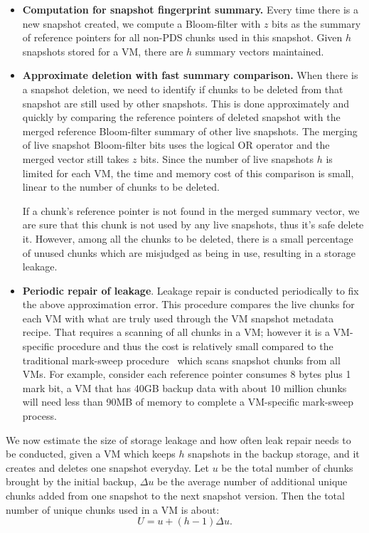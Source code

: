 \begin{itemize}
\item {\bf Computation for snapshot fingerprint summary.}
Every time there is a new snapshot created,
we compute a Bloom-filter with $z$ bits as the summary of reference pointers for all non-PDS chunks used 
in this snapshot. Given $h$ snapshots stored for a VM, there are $h$ summary vectors maintained.

\item {\bf Approximate deletion with fast summary comparison.}
When there is a snapshot deletion,  
we need to identify if  chunks to be deleted from that snapshot
are still used by other snapshots. 
This is done approximately and quickly by comparing the 
reference pointers of deleted snapshot with
the merged reference Bloom-filter summary of other live snapshots.
The merging of live snapshot Bloom-filter bits uses the logical OR operator 
and the merged vector still takes $z$ bits.
Since the number of live snapshots $h$ is limited for
each VM, 
the time and memory cost of this comparison is small, linear to the number of chunks to be deleted.

If a chunk's reference pointer is not found in the merged summary vector, we are sure that
this chunk is not used by any live snapshots, thus it's safe delete it. 
However, among all the chunks to be deleted, 
there is a small percentage of unused chunks  which
are misjudged as  being in use, resulting in a storage leakage.

\item {\bf Periodic repair of leakage}.
Leakage repair is conducted periodically to fix the above approximation error.
This procedure compares the live chunks for each VM with what are truly used through the VM snapshot metadata recipe.
That requires a scanning of all chunks in a VM; however it is a VM-specific procedure and thus
the cost is relatively small compared to the traditional mark-sweep procedure~\cite{Guo2011} which scans snapshot 
chunks from all VMs.
For example,
consider each reference pointer consumes 8 bytes plus  1 mark bit, a VM that has 40GB backup data with about
10 million chunks will need less than 90MB of memory to complete a VM-specific mark-sweep process.
\end{itemize}

We now estimate the size of storage leakage and how often leak repair needs to be conducted,
given  a VM which keeps $h$ snapshots in the backup storage, and it creates and deletes one snapshot
everyday. Let $u$ be the total number of chunks brought by the initial backup, $\Delta u$ be the average
number of additional unique chunks added from one snapshot to the next snapshot version. Then the total number of unique
chunks used in a VM is about:
\[
U = u + (h-1)\Delta u.
\]


